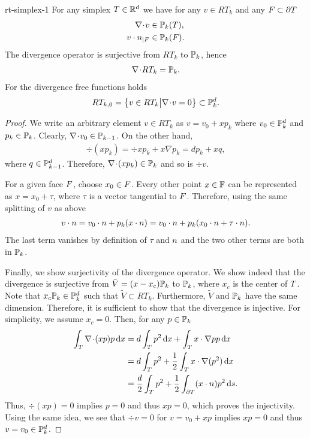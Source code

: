 \begin{Lemma}{rt-simplex-1}
  For any simplex $\cell\in\R^d$ we have for
  any $v\in RT_k$ and any $\face\subset\d\cell$
  \begin{align}
    \label{eq:darcy:21}
    \div v &\in \P_k(\cell), \\
    \label{eq:darcy:26}
    v\cdot\n_{|\face} &\in \P_k(\face).
  \end{align}
  The divergence operator is surjective from $RT_k$ to
  $\P_k$, hence
  \begin{gather}
    \label{eq:darcy:22}
    \div RT_k = \P_k.
  \end{gather}
  For the divergence free functions holds
  \begin{gather}
    \label{eq:darcy:24}
    RT_{k,0} = \bigl\{v\in RT_k \big\vert
    \div  v=0\bigr\} \subset \P_k^d.
  \end{gather}
\end{Lemma}

\begin{proof}
  We write an arbitrary element $v\in RT_k$ as $v=v_0+x p_k$ where
  $v_0\in \P_k^d$ and $p_k\in \P_k$. Clearly, $\div v_0 \in
  \P_{k-1}$. On the other hand,
  \begin{gather*}
    \div (x p_k) = \div x p_k + x\nabla p_k = d p_k + x q,
  \end{gather*}
  where $q\in \P_{k-1}^d$. Therefore, $\div(x p_k) \in \P_k$ and so is
  $\div v$.

  For a given face $\face$, choose $x_0\in\face$. Every other point
  $x\in \F$ can be represented as $x=x_0+ \tau$, where $\tau$ is a
  vector tangential to $\face$. Therefore, using the same splitting of
  $v$ as above
  \begin{gather*}
    v\cdot\n = v_0\cdot\n + p_k (x\cdot\n)
    = v_0\cdot\n + p_k (x_0\cdot\n + \tau\cdot\n).
  \end{gather*}
  The last term vanishes by definition of $\tau$ and $\n$ and the two
  other terms are both in $\P_k$.

  Finally, we show surjectivity of the divergence operator. We show
  indeed that the divergence is surjective from
  $\tilde V = (x-x_c)\P_k$ to $\P_k$, where $x_c$ is the center of
  $\cell$. Note that $x_c\P_k\in \P_k^d$ such that
  $\tilde V\subset RT_k$. Furthermore, $\tilde V$ and $\P_k$ have the
  same dimension. Therefore, it is sufficient to show that the
  divergence is injective. For simplicity, we assume $x_c=0$. Then,
  for any $p\in \P_k$
  \begin{align*}
    \int_\cell \div (x p)p \dx
    &= d \int_\cell p^2\dx + \int_\cell x \cdot\nabla p p\dx
    \\
    &= d \int_\cell p^2 + \frac12 \int_\cell x \cdot\nabla(p^2)\dx
    \\
    &= \frac d2 \int_\cell p^2 + \frac12 \int_{\d\cell} (x\cdot\n) p^2\ds.
  \end{align*}
  Thus, $\div(x p) = 0$ implies $p=0$ and thus $x p=0$, which proves the
  injectivity. Using the same idea, we see that $\div v=0$ for
  $v=v_0+x p$ implies $x p=0$ and thus $v=v_0\in\P_k^d$.
\end{proof}

